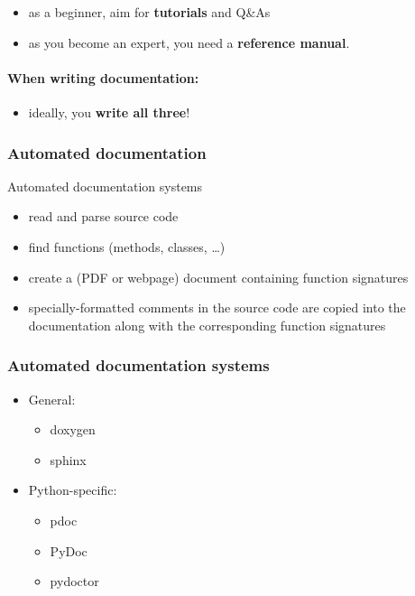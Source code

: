 \documentclass[12pt]{article}
\begin{document}
\begin{itemize}
  \item as a beginner, aim for \textbf{tutorials} and Q\&As
  \item as you become an expert, you need a \textbf{reference manual}.
\end{itemize}

\paragraph{When writing documentation:}

\begin{itemize}
  \item ideally, you \textbf{write all three}!
\end{itemize}

\subsubsection{Automated documentation}

Automated documentation systems

\begin{itemize}
  \item read and parse source code
  \item find functions (methods, classes, \ldots)
  \item create a (PDF or webpage) document containing function signatures
  \item specially-formatted comments in the source code are copied into the documentation along with the corresponding function signatures
\end{itemize}

\subsubsection{Automated documentation systems}

\begin{itemize}
\item General:
    \begin{itemize}
    \item doxygen
    \item sphinx
    \end{itemize}
\item Python-specific:
    \begin{itemize}
    \item pdoc
    \item PyDoc
    \item pydoctor
    \end{itemize}
\end{itemize}
\end{document}
